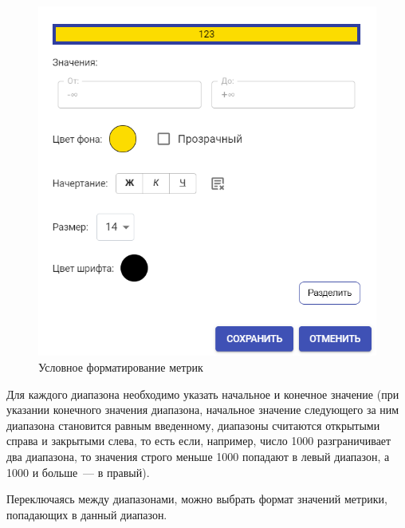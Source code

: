 \documentclass[../user-manual.tex]{subfiles}
\begin{document}
	\begin{figure}[h]
		\centering
		\includegraphics[width=\graphicswidth]{img/17-conditional-format.png}
		\caption{Условное форматирование метрик}
		\label{fig:conditional-format-1}
	\end{figure}
	
		
	Для каждого диапазона необходимо указать начальное и конечное значение (при указании конечного значения диапазона, начальное значение следующего за ним диапазона становится равным введенному, диапазоны считаются открытыми справа и закрытыми слева, то есть если, например, число 1000 разграничивает два диапазона, то значения строго меньше 1000 попадают в левый диапазон, а 1000 и больше~--- в правый).
	
	Переключаясь между диапазонами, можно выбрать формат значений метрики, попадающих в данный диапазон.
		
\end{document}

